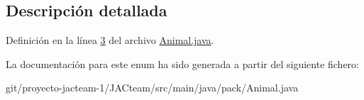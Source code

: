 \subsection{Descripción detallada}


Definición en la línea \mbox{\hyperlink{_animal_8java_source_l00003}{3}} del archivo \mbox{\hyperlink{_animal_8java_source}{Animal.\+java}}.



La documentación para este enum ha sido generada a partir del siguiente fichero\+:\begin{DoxyCompactItemize}
\item 
git/proyecto-\/jacteam-\/1/\+J\+A\+Cteam/src/main/java/pack/Animal.\+java\end{DoxyCompactItemize}
